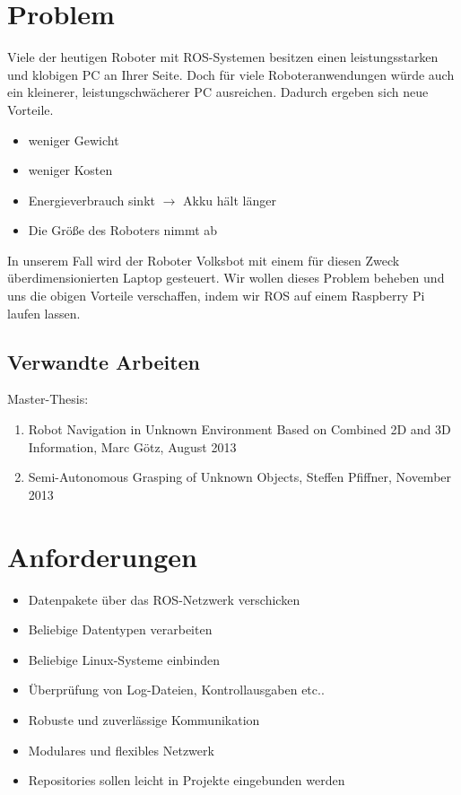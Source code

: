 \documentclass[12pt]{article}
\begin{document}
\section{Problem}

Viele der heutigen Roboter mit ROS-Systemen besitzen einen leistungsstarken und klobigen PC an Ihrer Seite.
Doch für viele Roboteranwendungen würde auch ein kleinerer, leistungschwächerer PC ausreichen.
Dadurch ergeben sich neue Vorteile.

\begin{itemize}
\item weniger Gewicht
\item weniger Kosten
\item Energieverbrauch sinkt $\rightarrow$ Akku hält länger
\item Die Größe des Roboters nimmt ab
\end{itemize}

In unserem Fall wird der Roboter Volksbot mit einem für diesen Zweck überdimensionierten Laptop gesteuert. Wir wollen dieses Problem beheben und uns die obigen Vorteile verschaffen, indem wir ROS auf einem Raspberry Pi laufen lassen.

\subsection{Verwandte Arbeiten}

Master-Thesis:
\begin{enumerate}

\item Robot Navigation in Unknown Environment Based on Combined 2D and 3D Information, Marc Götz, August 2013
\item Semi-Autonomous Grasping of Unknown Objects, Steffen Pfiffner, November 2013
\end{enumerate}

\section{Anforderungen}

\begin{itemize}
\item Datenpakete über das ROS-Netzwerk verschicken
\item Beliebige Datentypen verarbeiten
\item Beliebige Linux-Systeme einbinden
\item Überprüfung von Log-Dateien, Kontrollausgaben etc..
\item Robuste und zuverlässige Kommunikation
\item Modulares und flexibles Netzwerk
\item Repositories sollen leicht in Projekte eingebunden werden
\end{itemize}
\end{document}
